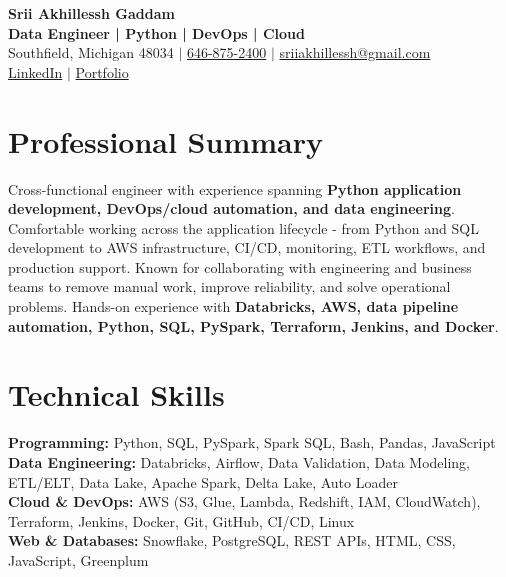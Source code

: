\documentclass[letterpaper,10pt]{article}
\begin{document}
\fontsize{9.35pt}{10.45pt}\selectfont

\begin{center}
    {\LARGE \textbf{Srii Akhillessh Gaddam}} \\[-1pt]
    \textbf{Data Engineer | Python | DevOps | Cloud} \\[2pt]
    Southfield, Michigan 48034 $|$
    \href{tel:6468752400}{646-875-2400} $|$
    \href{mailto:sriiakhillessh@gmail.com}{sriiakhillessh@gmail.com} \\[1pt]
    \href{https://www.linkedin.com/in/srii-akhiilessh-gaddam-b48668191/}{LinkedIn} $|$
    \href{https://sriiakhillesshg.github.io/portfolio/}{Portfolio}
\end{center}
\vspace{-8pt}

\section{Professional Summary}
\small{Cross-functional engineer with experience spanning \textbf{Python application development, DevOps/cloud automation, and data engineering}. Comfortable working across the application lifecycle - from Python and SQL development to AWS infrastructure, CI/CD, monitoring, ETL workflows, and production support. Known for collaborating with engineering and business teams to remove manual work, improve reliability, and solve operational problems. Hands-on experience with \textbf{Databricks, AWS, data pipeline automation, Python, SQL, PySpark, Terraform, Jenkins, and Docker}.}

\section{Technical Skills}
\small{
\textbf{Programming:} Python, SQL, PySpark, Spark SQL, Bash, Pandas, JavaScript \\
\textbf{Data Engineering:} Databricks, Airflow, Data Validation, Data Modeling, ETL/ELT, Data Lake, Apache Spark, Delta Lake, Auto Loader \\
\textbf{Cloud \& DevOps:} AWS (S3, Glue, Lambda, Redshift, IAM, CloudWatch), Terraform, Jenkins, Docker, Git, GitHub, CI/CD, Linux \\
\textbf{Web \& Databases:} Snowflake, PostgreSQL, REST APIs, HTML, CSS, JavaScript, Greenplum
}
\end{document}
